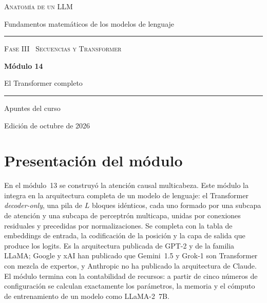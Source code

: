 \documentclass[11pt,a4paper,twoside,openany]{book}
\begin{document}
\frontmatter
\begin{titlepage}
\centering
\vspace*{2.5cm}
{\large\scshape Anatomía de un LLM}\par
\vspace{0.4cm}
{\normalsize Fundamentos matemáticos de los modelos de lenguaje}\par
\vspace{2.2cm}
\rule{\textwidth}{0.8pt}\par\vspace{0.5cm}
{\small\scshape Fase III \textperiodcentered\ Secuencias y Transformer}\par\vspace{0.3cm}
{\Huge\bfseries Módulo 14\par}\vspace{0.3cm}
{\LARGE El Transformer completo\par}
\vspace{0.5cm}\rule{\textwidth}{0.4pt}\par
\vspace{1.6cm}
{\large Apuntes del curso}\par
\vfill
{\small Edición de octubre de 2026}\par
\end{titlepage}

\chapter*{Presentación del módulo}

En el módulo~13 se construyó la atención causal multicabeza. Este módulo la integra en la arquitectura completa de un modelo de lenguaje: el Transformer \emph{decoder-only}, una pila de $L$ bloques idénticos, cada uno formado por una subcapa de atención y una subcapa de perceptrón multicapa, unidas por conexiones residuales y precedidas por normalizaciones. Se completa con la tabla de embeddings de entrada, la codificación de la posición y la capa de salida que produce los logits. Es la arquitectura publicada de GPT-2 y de la familia LLaMA; Google y xAI han publicado que Gemini~1.5 y Grok-1 son Transformer con mezcla de expertos, y Anthropic no ha publicado la arquitectura de Claude. El módulo termina con la contabilidad de recursos: a partir de cinco números de configuración se calculan exactamente los parámetros, la memoria y el cómputo de entrenamiento de un modelo como LLaMA-2~7B.
\end{document}

